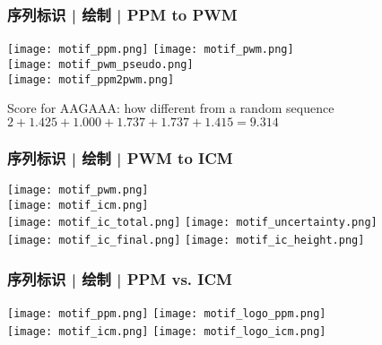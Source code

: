 \begin{frame}
  \frametitle{序列标识 | 绘制 | PPM to PWM}
  \begin{center}
    \texttt{[image: motif\_ppm.png]}
    \hspace{1em}
    \texttt{[image: motif\_pwm.png]}\\
    \vspace{1em}
    \texttt{[image: motif\_pwm\_pseudo.png]}\\
    \vspace{1em}
    \texttt{[image: motif\_ppm2pwm.png]}
  \end{center}
  \vspace{-1em}
  \begin{block}{Score for AAGAAA: how different from a random sequence}
    $2 + 1.425 + 1.000 + 1.737 + 1.737 + 1.415 = 9.314$
  \end{block}
\end{frame}

\begin{frame}
  \frametitle{序列标识 | 绘制 | PWM to ICM}
  \begin{center}
    \texttt{[image: motif\_pwm.png]}\\
    \vspace{0.5em}
    \texttt{[image: motif\_icm.png]}\\
    \vspace{0.5em}
    \texttt{[image: motif\_ic\_total.png]}
    \hspace{1em}
    \texttt{[image: motif\_uncertainty.png]}\\
    \vspace{0.5em}
    \texttt{[image: motif\_ic\_final.png]}
    \hspace{1em}
    \texttt{[image: motif\_ic\_height.png]}
  \end{center}
\end{frame}

\begin{frame}
  \frametitle{序列标识 | 绘制 | PPM vs. ICM}
  \begin{center}
    \texttt{[image: motif\_ppm.png]}
    \hspace{0.5em}
    \texttt{[image: motif\_logo\_ppm.png]}\\
    \vspace{1em}
    \texttt{[image: motif\_icm.png]}
    \hspace{0.5em}
    \texttt{[image: motif\_logo\_icm.png]}
  \end{center}
\end{frame}

